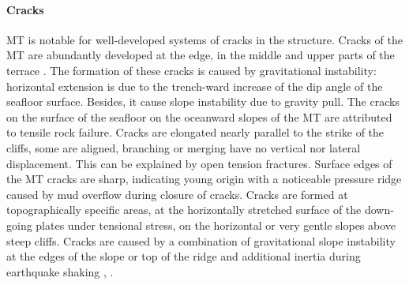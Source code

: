 \documentclass[11pt,a4paper]{report}
\begin{document}
\paragraph{Cracks}
\ac{MT} is notable for well-developed systems of cracks in the structure. Cracks of the \ac{MT} are abundantly developed at the edge, in the middle and upper parts of the terrace \cite{HeuretLallemand2005}. The formation of these cracks is caused by gravitational instability: horizontal extension is due to the trench-ward increase of the dip angle of the seafloor surface. Besides, it cause slope instability due to gravity pull. The cracks on the surface of the seafloor on the oceanward slopes of the \ac{MT} are attributed to tensile rock failure. 
Cracks are elongated nearly parallel to the strike of the cliffs, some are aligned, branching or merging have no vertical nor lateral displacement. This can be explained by open tension fractures. Surface edges of the \ac{MT} cracks are sharp, indicating young origin with a noticeable pressure ridge caused by mud overflow during closure of cracks. Cracks are formed at topographically specific areas, at the horizontally stretched surface of the down-going plates under tensional stress, on the horizontal or very gentle slopes above steep cliffs. Cracks are caused by a combination of gravitational slope instability at the edges of the slope or top of the ridge \cite{Ishizukaetal2010} and additional inertia during earthquake shaking \cite{Demetsetal1990}, \cite{Schellart2007}.
\end{document}
